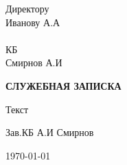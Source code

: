 \documentclass[a4paper,12pt,oneside]{article}
\begin{document}
\hangindent=10cm
\noindent Директору \\
Иванову А.А\\ \\
КБ\\
Смирнов А.И
\vspace{2cm}
\begin{center}
\textbf{СЛУЖЕБНАЯ ЗАПИСКА}
\end{center}
Текст
\begin{center}
\vspace{2cm}
Зав.КБ \hspace*{4cm} А.И Смирнов
\end{center}
\vspace{1cm}
\today
\end{document}
